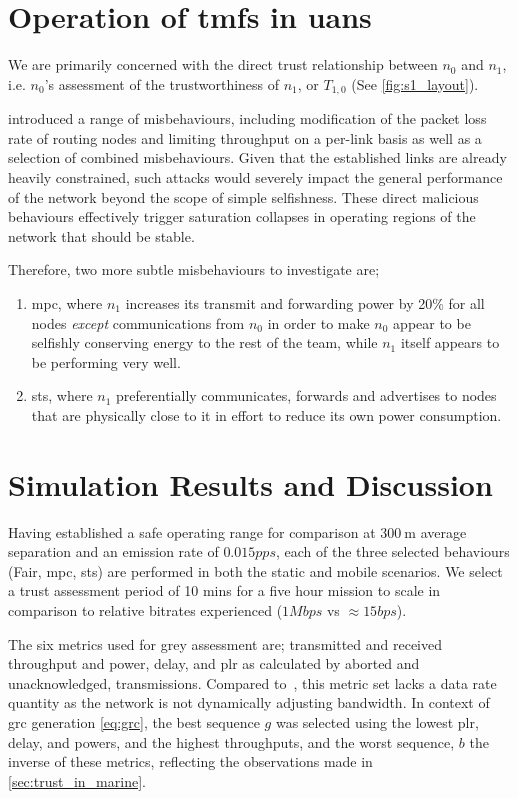 \section{Operation of \glspl{tmf} in \glspl{uan}}

We are primarily concerned with the direct trust relationship between $n_0$ and $n_1$, i.e. $n_0$'s assessment of the trustworthiness of $n_1$, or $T_{1,0}$ (See \autoref{fig:s1_layout}).

\citet{Guo11} introduced a range of misbehaviours, including modification of the packet loss rate of routing nodes and limiting throughput on a per-link basis as well as a selection of combined misbehaviours. 
Given that the established links are already heavily constrained, such attacks would severely impact the general performance of the network beyond the scope of simple selfishness.
These direct malicious behaviours effectively trigger saturation collapses in operating regions of the network that should be stable.

Therefore, two more subtle misbehaviours to investigate are; 
\begin{enumerate}
	\item \acrfull{mpc}, where $n_1$ increases its transmit and forwarding power by 20\% for all nodes \emph{except} communications from $n_0$ in order to make $n_0$ appear to be selfishly conserving energy to the rest of the team, while $n_1$ itself appears to be performing very well.
	\item \acrfull{sts}, where $n_1$ preferentially communicates, forwards and advertises to nodes that are physically close to it in effort to reduce its own power consumption.
\end{enumerate}


\section{Simulation Results and Discussion}\label{sec:trustresultsanddiscussion}

Having established a safe operating range for comparison at $\SI{300}{\meter}$ average separation and an emission rate of $0.015pps$, each of the three selected behaviours (Fair, \gls{mpc}, \gls{sts}) are performed in both the static and mobile scenarios. 
We select a trust assessment period of 10 mins for a five hour mission to scale in comparison to relative bitrates experienced ($1Mbps$ vs $\approx15bps$).

The six metrics used for grey assessment are; transmitted and received throughput and power, delay, and \gls{plr} as calculated by aborted and unacknowledged, transmissions.
Compared to~\cite{Guo11}, this metric set lacks a data rate quantity as the network is not dynamically adjusting bandwidth.
In context of \gls{grc} generation \autoref{eq:grc}, the best sequence $g$ was selected using the lowest \gls{plr}, delay, and powers, and the highest throughputs, and the worst sequence, $b$ the inverse of these metrics, reflecting the observations made in \autoref{sec:trust_in_marine}.

